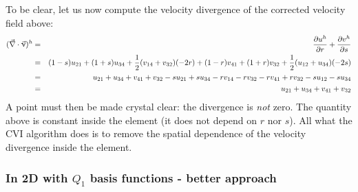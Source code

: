 To be clear, let us now compute the velocity divergence of the corrected 
velocity field above:
\begin{eqnarray}
(\vec\nabla\cdot\vec\upnu)^h 
&=&
\frac{\partial u^h}{\partial r}+
\frac{\partial v^h}{\partial s}
\nonumber\\
&=& (1-s) u_{21} + (1+s) u_{34} +  \frac{1}{2}(v_{14} + v_{32})(-2r)
+ (1-r) v_{41} + (1+r) v_{32}  + \frac{1}{2} (u_{12} + u_{34})(-2s) \nonumber\\
&=& u_{21} + u_{34} + v_{41} + v_{32}
-s u_{21} + s u_{34} -r v_{14} -r v_{32} 
-r v_{41} + r v_{32} -s u_{12} -s u_{34} \nonumber\\
&=& u_{21} + u_{34} + v_{41} + v_{32} 
\end{eqnarray}
A point must then be made crystal clear: the divergence is
{\it not} zero. The quantity above is constant inside the element 
(it does not depend on $r$ nor $s$). 
All what the CVI algorithm does is to remove the spatial dependence
of the velocity divergence inside the element.

\subsubsection{In 2D with $Q_1$ basis functions - better approach}


